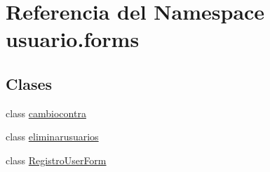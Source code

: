 \hypertarget{namespaceusuario_1_1forms}{}\section{Referencia del Namespace usuario.\+forms}
\label{namespaceusuario_1_1forms}
\subsection*{Clases}
\begin{DoxyCompactItemize}
\item 
class \hyperlink{classusuario_1_1forms_1_1cambiocontra}{cambiocontra}
\item 
class \hyperlink{classusuario_1_1forms_1_1eliminarusuarios}{eliminarusuarios}
\item 
class \hyperlink{classusuario_1_1forms_1_1_registro_user_form}{Registro\+User\+Form}
\end{DoxyCompactItemize}

